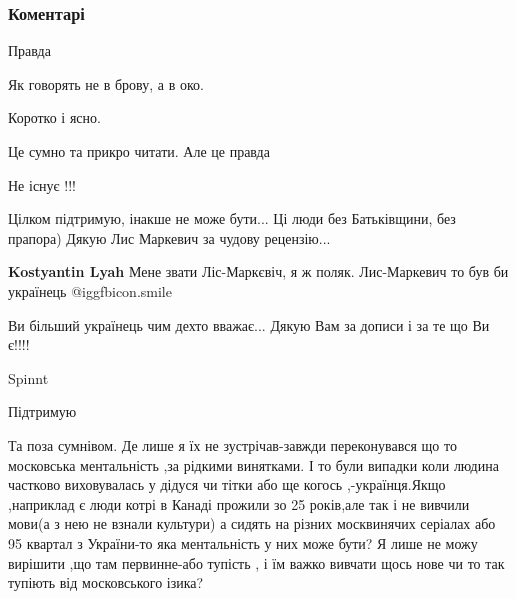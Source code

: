  
 
 
 
 
\subsubsection{Коментарі}

\begin{itemize} %
Правда

Як говорять не в брову, а в око.

Коротко і ясно.

Це сумно та прикро читати. Але це правда

Не існує !!!


Цілком підтримую, інакше не може бути... Ці люди без Батьківщини, без прапора)
Дякую Лис Маркевич за чудову рецензію...

\begin{itemize} %
\textbf{Kostyantin Lyah} Мене звати Ліс-Маркєвіч, я ж поляк. Лис-Маркевич то був би українець  @igg{fbicon.smile} 


Ви більший українець чим дехто вважає...
Дякую Вам за дописи і за те що Ви є!!!!
\end{itemize} %

Spinnt

Підтримую


Та поза сумнівом. Де лише я їх не зустрічав-завжди переконувався що то
московська ментальність ,за рідкими винятками. І то були випадки коли людина
частково виховувалась у дідуся чи тітки або ще когось ,-українця.Якщо
,наприклад є люди котрі в Канаді прожили зо 25 років,але так і не вивчили
мови(а з нею не взнали культури) а сидять на різних москвинячих серіалах або 95
квартал з України-то яка ментальність у них може бути? Я лише не можу вирішити
,що там первинне-або тупість , і їм важко вивчати щось нове чи то так тупіють
від московського ізика?


\end{itemize}
